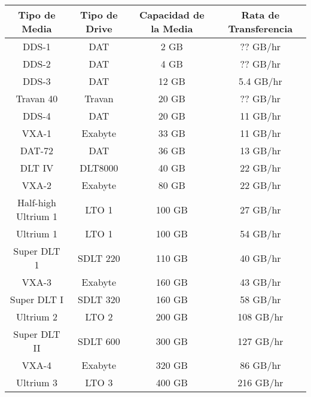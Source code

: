 \begin{tabular}{|c|c|c|c}
Tipo de Media & Tipo de Drive & Capacidad de la Media & Rata de Transferencia \\ \hline
DDS-1              & DAT        & 2 GB &        ?? GB/hr   \\ \hline
DDS-2              & DAT        & 4 GB &        ?? GB/hr   \\ \hline
DDS-3              & DAT        & 12 GB &       5.4 GB/hr   \\ \hline
Travan 40          & Travan     & 20 GB &       ?? GB/hr    \\ \hline
DDS-4              & DAT        & 20 GB &       11 GB/hr    \\ \hline
VXA-1              & Exabyte    & 33 GB &       11 GB/hr    \\ \hline
DAT-72             & DAT        & 36 GB &       13 GB/hr    \\ \hline
DLT IV             & DLT8000    & 40 GB  &      22 GB/hr    \\ \hline
VXA-2              & Exabyte    & 80 GB &       22 GB/hr    \\ \hline
Half-high Ultrium 1 & LTO 1      & 100 GB &      27 GB/hr    \\ \hline
Ultrium 1          & LTO 1      & 100 GB &      54 GB/hr    \\ \hline
Super DLT 1        & SDLT 220   & 110 GB &      40 GB/hr    \\ \hline
VXA-3              & Exabyte    & 160 GB &      43 GB/hr    \\ \hline
Super DLT I        & SDLT 320   & 160 GB &      58 GB/hr    \\ \hline
Ultrium 2          & LTO 2      & 200 GB &      108 GB/hr   \\ \hline
Super DLT II       & SDLT 600   & 300 GB &      127 GB/hr   \\ \hline
VXA-4              & Exabyte    & 320 GB &      86 GB/hr    \\ \hline
Ultrium 3          & LTO 3      & 400 GB &      216 GB/hr   \\ \hline
\end{tabular}
